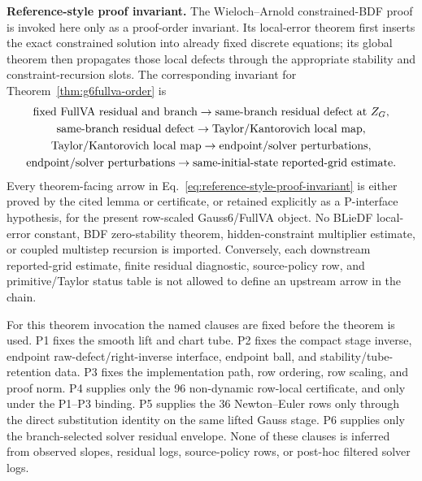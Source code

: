 \documentclass[preprint,12pt]{elsarticle}
\begin{document}
\noindent\textbf{Reference-style proof invariant.}
The Wieloch--Arnold constrained-BDF proof is invoked here only as a proof-order
invariant.  Its local-error theorem first inserts the exact constrained
solution into already fixed discrete equations; its global theorem then
propagates those local defects through the appropriate stability and
constraint-recursion slots.  The corresponding invariant for
Theorem~\ref{thm:g6fullva-order} is
\begin{equation}
\label{eq:reference-style-proof-invariant}
  \begin{gathered}
  \hbox{fixed FullVA residual and branch}
  \rightarrow
  \hbox{same-branch residual defect at } Z_G,\\
  \hbox{same-branch residual defect}
  \rightarrow
  \hbox{Taylor/Kantorovich local map},\\
  \hbox{Taylor/Kantorovich local map}
  \rightarrow
  \hbox{endpoint/solver perturbations},\\
  \hbox{endpoint/solver perturbations}
  \rightarrow
  \hbox{same-initial-state reported-grid estimate}.
  \end{gathered}
\end{equation}
Every theorem-facing arrow in
Eq.~\eqref{eq:reference-style-proof-invariant} is either proved by the cited
lemma or certificate, or retained explicitly as a P-interface hypothesis, for
the present row-scaled Gauss6/FullVA object.  No BLieDF local-error constant, BDF
zero-stability theorem, hidden-constraint multiplier estimate, or coupled
multistep recursion is imported.  Conversely, each downstream reported-grid estimate,
finite residual diagnostic, source-policy row, and primitive/Taylor status
table is not allowed to define an upstream arrow in the chain.

For this theorem invocation the named clauses are fixed before the theorem is
used.  P1 fixes the smooth lift and chart tube.  P2 fixes the compact stage
inverse, endpoint raw-defect/right-inverse interface, endpoint ball, and
stability/tube-retention data.  P3 fixes the implementation path, row
ordering, row scaling, and proof norm.  P4 supplies only the 96 non-dynamic
row-local certificate, and only under the P1--P3 binding.  P5 supplies the 36
Newton--Euler rows only through the direct substitution identity on the same
lifted Gauss stage.  P6 supplies only the branch-selected solver residual
envelope.  None of these clauses is inferred from observed slopes, residual
logs, source-policy rows, or post-hoc filtered solver logs.
\end{document}
